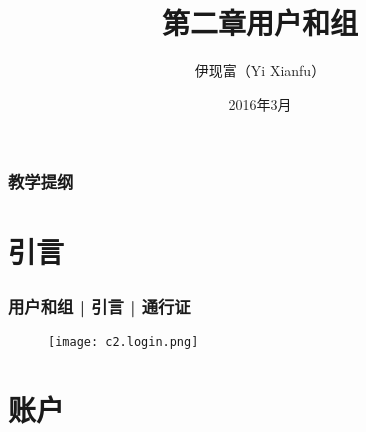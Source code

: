 



\title[用户和组]{第二章\quad 用户和组}
\author[Yixf]{伊现富（Yi Xianfu）}
\date{2016年3月}


\begin{frame}
  \titlepage
\end{frame}

\begin{frame}[plain,label=current]
  \frametitle{教学提纲}
  \setcounter{tocdepth}{3}
  \begin{multicols}{2}
    \tableofcontents
  \end{multicols}
\end{frame}

\section{引言}
\begin{frame}
  \frametitle{用户和组 | 引言 | 通行证}
  \begin{figure}
    \centering
    \texttt{[image: c2.login.png]}
  \end{figure}
\end{frame}

\section{账户}
